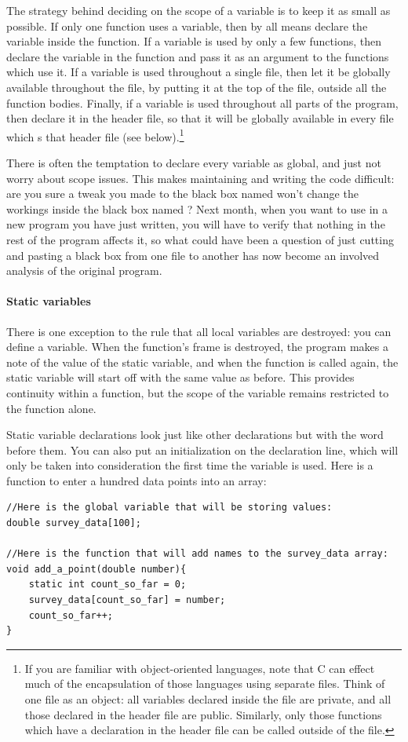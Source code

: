 \documentclass[12pt]{article}
\makeatletter
\def\ttind#1{\index{#1@\cinline{#1}}\cinline{#1}}
\makeatother
\begin{document}
The strategy behind deciding on the scope of a variable is
to keep it as small as possible. If only one function uses a variable,
then by all means declare the variable inside the function.
If a variable is used by only a few functions,
then declare the variable in the  function and pass it as an
argument to the functions which use it. If a variable is used throughout
a single file, then let it be globally available throughout the file, by
putting it at the top of the file, outside all the function bodies. Finally,
if a variable is used throughout all parts of the program, then declare it in
the header file, so that it will be globally available in every
file which s that header file (see below).\footnote{If
you are familiar with object-oriented languages, note that C can effect
much of the encapsulation of those languages using separate files. Think
of one file as an object: all variables declared inside the file are
private, and all those declared in the header file are public. Similarly,
only those functions which have a declaration in the header file can be
called outside of the file.}

There is often the temptation to declare every variable as global, and
just not worry about scope issues. This makes maintaining and writing
the code difficult: are you sure a tweak you made to the black box named
 won't change the workings inside the black box named
? Next month, when you want to use 
in a new program you have just written, you will have to verify that nothing
in the rest of the program affects it, so what could have been a question
of just cutting and pasting a black box from one file to another has
now become an involved analysis of the original program.  

\paragraph{Static variables} There is one exception to the rule that
all local variables are destroyed: you can define a 
variable. When the function's frame is destroyed, the program makes a
note of the value of the  static variable, and when the function is called
again, the static variable will start off with the same value
as before. This provides continuity within a function, but the scope
of the variable remains restricted to the function alone.

Static variable declarations look just like other declarations but with
the word \ttind{static} before them. You can also put an initialization on
the declaration line, which will only be taken into consideration the
first time the variable is used. Here is a function to enter a hundred
data points into an array:
\begin{lstlisting}
//Here is the global variable that will be storing values:
double survey_data[100];

//Here is the function that will add names to the survey_data array:
void add_a_point(double number){
    static int count_so_far = 0;
    survey_data[count_so_far] = number;
    count_so_far++;
}
\end{lstlisting}
\end{document}
